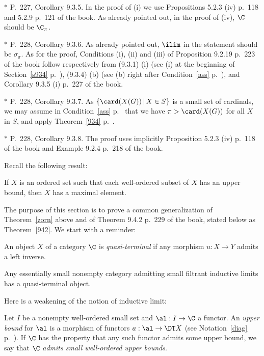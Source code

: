 \documentclass[12pt]{article}
\theoremstyle{remark}
\theoremstyle{definition}
\begin{document}
\nn$*$ P.~227, Corollary 9.3.5. In the proof of (i) we use Propositions 5.2.3 (iv) p.~118 and 5.2.9 p.~121 of the book. As already pointed out, in the proof of (iv), $\C$ should be $\C_\pi$. 

\nn$*$ P.~228, Corollary 9.3.6. As already pointed out, $\ilim$ in the statement should be $\sigma_\pi$. As for the proof, Conditions (i), (ii) and (iii) of Proposition 9.2.19 p.~223 of the book follow respectively from (9.3.1) (i) (see (i) at the beginning of Section~\ref{s934} p.~), (9.3.4) (b) (see (b) right after Condition~\ref{ass} p.~), and Corollary 9.3.5 (i) p.~227 of the book. 

\nn$*$ P.~228, Corollary 9.3.7. As $\{\card(X(G))\,|\,X\in S\}$ is a small set of cardinals, we may assume in Condition~\ref{ass} p.~ that we have $\pi>\card(X(G))$ for all $X$ in $S$, and apply Theorem~\ref{934} p.~. 

\nn$*$ P.~228, Corollary 9.3.8. The proof uses implicitly Proposition 5.2.3 (iv) p.~118 of the book and Example 9.2.4 p.~218 of the book. 



Recall the following result:

\begin{thm}
If $X$ is an ordered set such that each well-ordered subset of $X$ has an upper bound, then $X$ has a maximal element.
\end{thm}

The purpose of this section is to prove a common generalization of Theorem~\ref{zorn} above and of Theorem 9.4.2 p.~229 of the book, stated below as Theorem~\ref{942}. We start with a reminder:

\begin{df} 
An object $X$ of a category $\C$ is {\em quasi-terminal} if any morphism $u:X\to Y$ admits a left inverse.
\end{df}

\begin{thm}[Theorem 9.4.2 p.~229] 
Any essentially small nonempty category admitting small filtrant inductive limits has a quasi-terminal object.
\end{thm}

Here is a weakening of the notion of inductive limit:

\begin{df} 
Let $I$ be a nonempty well-ordered small set and $\al:I\to\C$ a functor. An {\em upper bound} for $\al$ is a morphism of functors $a:\al\to\DT X$ (see Notation~\ref{diag} p.~). If $\C$ has the property that any such functor admits some upper bound, we say that $\C$ {\em admits small well-ordered upper bounds}. 
\end{df}
\end{document}
